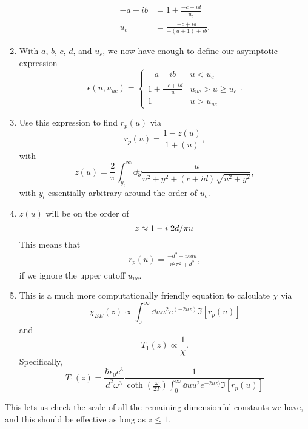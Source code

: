 \documentclass[../main.tex]{subfiles}
\begin{document}
\begin{enumerate}
\begin{align}
			-a + ib &= 1 + \frac{-c + id}{u_c} \\
			u_c &= \frac{-c + id}{-(a + 1) + ib}.
		\end{align}
		\item With $a$, $b$, $c$, $d$, and $u_c$, we now have enough to define our asymptotic expression
		\begin{equation}
			\epsilon(u, u_{uc}) =
			\begin{cases}
				-a + i b & u < u_c \\
				1 + \frac{-c + i d}{u} &  u_{uc} > u \geq u_c \\
				1 & u > u_{uc}
			\end{cases}.
		\end{equation}
		\item Use this expression to find $r_p(u)$ via
		\begin{equation}
			r_p(u) = \frac{1 - z(u)}{1 + (u)},
		\end{equation}
		with
		\begin{equation}
			z(u) = \frac{2}{\pi} \int_{y_l}^{\infty} \dd{y} \frac{u}{u^2 + y^2 + (c + i d)\sqrt{u^2 + y^2}},
		\end{equation}
		with $y_l$ essentially arbitrary around the order of $u_c$.
		\item $z(u)$ will be on the order of
		\begin{equation}
			z \approx 1 - i \flatfrac{2 d}{\pi u}
		\end{equation}
		This means that 
		\begin{align}
			r_p(u) = \frac{-d^2 + i \pi d u}{u^2 \pi^2 + d^2},
		\end{align}
		if we ignore the upper cutoff $u_{uc}$.
		\item This is a much more computationally friendly equation to calculate $\chi$ via
		\begin{equation}
			\chi_{EE}(z) \propto \int_0^\infty \dd{u} u^2 e^(-2 u z) \Im[r_p(u)]
		\end{equation}
		and
		\begin{equation}
			T_1(z) \propto \frac{1}{\chi}.
		\end{equation}
		Specifically,
		\begin{equation}
			T_1(z) = \frac{\hbar \epsilon_0 c^{3}}{d^2 \omega^3} \frac{1}{\coth(\frac{\omega}{2 T}) \int_0^\infty \dd{u} u^2 e^{-2 u z)} \Im[r_p(u)]}
		\end{equation}
	\end{enumerate}
	This lets us check the scale of all the remaining dimensionful constants we have, and this should be effective as long as $z \leq 1$.
\end{document}
